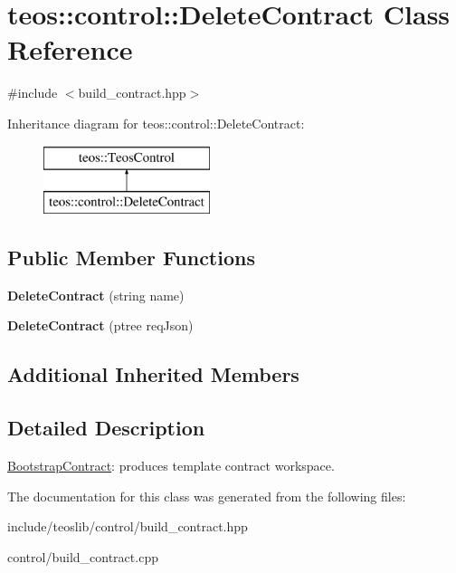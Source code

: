 \hypertarget{classteos_1_1control_1_1_delete_contract}{}\section{teos\+:\+:control\+:\+:Delete\+Contract Class Reference}
\label{classteos_1_1control_1_1_delete_contract}


{\ttfamily \#include $<$build\+\_\+contract.\+hpp$>$}

Inheritance diagram for teos\+:\+:control\+:\+:Delete\+Contract\+:\begin{figure}[H]
\begin{center}
\leavevmode
\includegraphics[height=2.000000cm]{classteos_1_1control_1_1_delete_contract}
\end{center}
\end{figure}
\subsection*{Public Member Functions}
\begin{DoxyCompactItemize}
\item 
\mbox{\label{classteos_1_1control_1_1_delete_contract_a9f91d7395f390ff68db2417d73be8c35}} 
{\bfseries Delete\+Contract} (string name)
\item 
\mbox{\label{classteos_1_1control_1_1_delete_contract_ac519ac86917200febf0195a4d2ce60ab}} 
{\bfseries Delete\+Contract} (ptree req\+Json)
\end{DoxyCompactItemize}
\subsection*{Additional Inherited Members}


\subsection{Detailed Description}
\mbox{\hyperlink{classteos_1_1control_1_1_bootstrap_contract}{Bootstrap\+Contract}}\+: produces template contract workspace. 

The documentation for this class was generated from the following files\+:\begin{DoxyCompactItemize}
\item 
include/teoslib/control/build\+\_\+contract.\+hpp\item 
control/build\+\_\+contract.\+cpp\end{DoxyCompactItemize}
